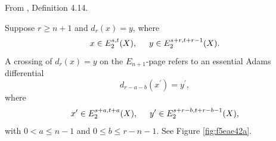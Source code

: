 \begin{definition}
\label{paper:4.14}
From \cite{LWX126}, Definition 4.14.\par
\label{def:classicalcrossdiff}
    Suppose $r\ge n+1$ and $d_r(x)=y$, where
    $$x\in E_2^{s,t}(X), \hspace{0.5cm} y\in E_2^{s+r,t+r-1}(X).$$
    A crossing of $d_r(x)=y$ on the $E_{n+1}$-page refers to an essential Adams differential
    $$d_{r-a-b}(x^\prime)=y^\prime,$$
    where
    $$x^\prime\in E_2^{s+a,t+a}(X), \hspace{.5cm} y^\prime\in E_2^{s+r-b,t+r-b-1}(X),$$
    with $0<a\le n-1$ and $0\le b\le r-n-1$. See Figure \ref{fig:f5eae42a}.




\end{definition}

